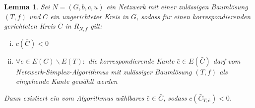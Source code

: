 \documentclass[a4paper,twoside,ngerman]{report}
\theoremstyle{plain}
\newtheorem{lem}[thm]{Lemma}
\theoremstyle{definition}
\begin{document}
\begin{lem}\label{iterierbar}Sei $N=(G,b,c,u)$ ein Netzwerk mit einer zulässigen Baumlösung $(T,f)$ und $C$ ein ungerichteter Kreis in $G$, sodass für einen korrespondierenden gerichteten Kreis $\bar{C}$ in $R_{N,f}$ gilt:
\begin{enumerate}[(i)]
	\item $c(\bar{C})<0$\label{negativ}
	\item $\forall e\in E(C)\backslash E(T) :$ die korrespondierende Kante $\bar{e}\in E(\bar{C})$ darf vom Netzwerk-Simplex-Algorithmus mit zulässiger Baumlösung $(T,f)$ als eingehende Kante gewählt werden\label{wählbar}
\end{enumerate}
Dann existiert ein vom Algorithmus wählbares $\bar{e}\in\bar{C}$, sodass $c(\bar{C}_{T,\bar{e}})<0$.
\end{lem}
\end{document}
